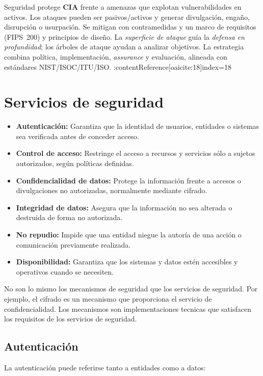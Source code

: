 \documentclass[11pt,a4paper]{article}
\begin{document}
    \begin{ResumenBox}
        Seguridad protege \textbf{CIA} frente a amenazas que explotan vulnerabilidades en activos.
        Los ataques pueden ser pasivos/activos y generar divulgación, engaño, disrupción o usurpación.
        Se mitigan con contramedidas y un marco de requisitos (FIPS~200) y principios de diseño.
        La \textit{superficie de ataque} guía la \textit{defensa en profundidad}; los árboles de ataque ayudan a analizar objetivos.
        La estrategia combina política, implementación, \textit{assurance} y evaluación, alineada con estándares NIST/ISOC/ITU/ISO. :contentReference[oaicite:18]{index=18}
    \end{ResumenBox}

    \section{Servicios de seguridad}
    \begin{itemize}
        \item \textbf{Autenticación:} Garantiza que la identidad de usuarios, entidades o sistemas sea verificada antes de conceder acceso.
        \item \textbf{Control de acceso:} Restringe el acceso a recursos y servicios sólo a sujetos autorizados, según políticas definidas.
        \item \textbf{Confidencialidad de datos:} Protege la información frente a accesos o divulgaciones no autorizadas, normalmente mediante cifrado.
        \item \textbf{Integridad de datos:} Asegura que la información no sea alterada o destruida de forma no autorizada.
        \item \textbf{No repudio:} Impide que una entidad niegue la autoría de una acción o comunicación previamente realizada.
        \item \textbf{Disponibilidad:} Garantiza que los sistemas y datos estén accesibles y operativos cuando se necesiten.
    \end{itemize}

    No son lo mismo los mecanismos de seguridad que los servicios de seguridad. Por ejemplo, el cifrado es un mecanismo que proporciona el servicio de confidencialidad.
    Los mecanismos son implementaciones tecnicas que satisfacen los requisitos de los servicios de seguridad.

    \subsection{Autenticación}
    La autenticación puede referirse tanto a entidades como a datos:
\end{document}
